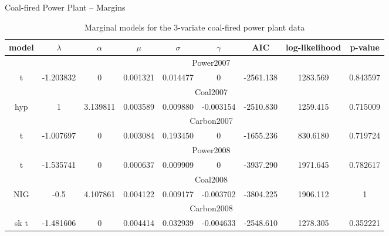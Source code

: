 Coal-fired Power Plant -- Margins
\tiny
\begin{table}[ht]
                \begin{center}
                    \begin{tabular}{c|c|c|c|c|c|c|c|c}
                        model&$\lambda$&$\overline{\alpha}$&$\mu$&$\sigma$&$\gamma$&AIC&log-likelihood&p-value\\\hline
                        &\multicolumn{8}{c}{Power2007}\\\cline{2-9}
                        t&-1.203832&0&0.001321&0.014477&0&-2561.138&1283.569&0.843597\\\hline
                        &\multicolumn{8}{c}{Coal2007}\\\cline{2-9}
                        hyp&1&3.139811&0.003589&0.009880&-0.003154&-2510.830&1259.415&0.715009\\\hline
                        &\multicolumn{8}{c}{Carbon2007}\\\cline{2-9}
                        t&-1.007697&0&0.003084&0.193450&0&-1655.236&830.6180&0.719724\\\hline
                        &\multicolumn{8}{c}{Power2008}\\\cline{2-9}
                        t&-1.535741&0&0.000637&0.009909&0&-3937.290&1971.645&0.782617\\\hline
                        &\multicolumn{8}{c}{Coal2008}\\\cline{2-9}
                        NIG&-0.5&4.107861&0.004122&0.009177&-0.003702&-3804.225&1906.112&1\\\hline
                        &\multicolumn{8}{c}{Carbon2008}\\\cline{2-9}
                        sk t&-1.481606&0&0.004414&0.032939&-0.004633&-2548.610&1278.305&0.352221\\\hline
                    \end{tabular}
                    \caption{Marginal models for the 3-variate coal-fired power plant data}
                \end{center}
            \end{table}
						
